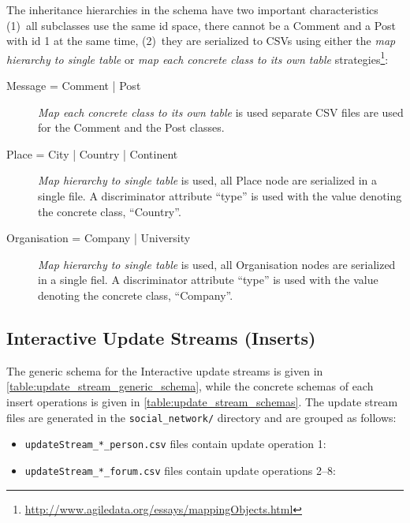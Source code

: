 The inheritance hierarchies in the schema have two important characteristics
(1)~all subclasses use the same id space, \eg there cannot be a Comment and a Post with id 1 at the same time,
(2)~they are serialized to CSVs using either the \emph{map hierarchy to single table} or \emph{map each concrete class to its own table} strategies\footnote{\url{http://www.agiledata.org/essays/mappingObjects.html}}:

\begin{description}
    \item[Message = Comment | Post]
    \emph{Map each concrete class to its own table} is used \ie separate CSV files are used for the Comment and the Post classes.

    \item[Place = City | Country | Continent]
    \emph{Map hierarchy to single table} is used, \ie all Place node are serialized in a single file. A discriminator attribute ``type'' is used with the value denoting the concrete class, \eg ``Country''.

    \item[Organisation = Company | University]
    \emph{Map hierarchy to single table} is used, \ie all Organisation nodes are serialized in a single fiel. A discriminator attribute ``type'' is used with the value denoting the concrete class, \eg ``Company''.
\end{description}

\subsection{Interactive Update Streams (Inserts)}

The generic schema for the Interactive update streams is given in \autoref{table:update_stream_generic_schema}, while the concrete schemas of each insert operations is given in \autoref{table:update_stream_schemas}.
The update stream files are generated in the \texttt{social\_network/} directory and are grouped as follows:

\begin{itemize}
    \item \texttt{updateStream\_*\_person.csv} files contain update operation 1: 
    \item \texttt{updateStream\_*\_forum.csv} files contain update operations 2--8: %
\end{itemize}

